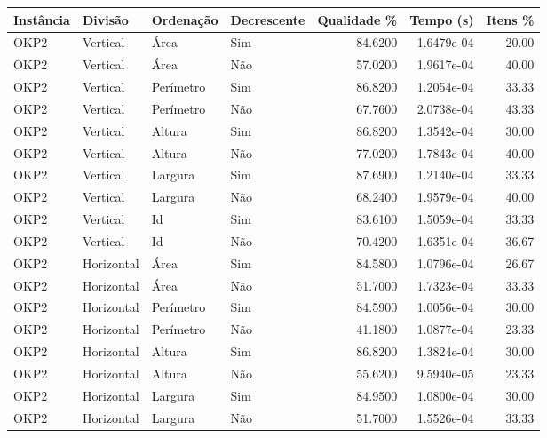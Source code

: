\begin{tabular}{llllrrr}
    \hline
    Instância & Divisão     & Ordenação & Decrescente & Qualidade \% & Tempo (s)  & Itens \% \\
    \hline
    OKP2      & Vertical    & Área      & Sim         & 84.6200      & 1.6479e-04 & 20.00    \\
    OKP2      & Vertical    & Área      & Não         & 57.0200      & 1.9617e-04 & 40.00    \\
    OKP2      & Vertical    & Perímetro & Sim         & 86.8200      & 1.2054e-04 & 33.33    \\
    OKP2      & Vertical    & Perímetro & Não         & 67.7600      & 2.0738e-04 & 43.33    \\
    OKP2      & Vertical    & Altura    & Sim         & 86.8200      & 1.3542e-04 & 30.00    \\
    OKP2      & Vertical    & Altura    & Não         & 77.0200      & 1.7843e-04 & 40.00    \\
    OKP2      & Vertical    & Largura   & Sim         & 87.6900      & 1.2140e-04 & 33.33    \\
    OKP2      & Vertical    & Largura   & Não         & 68.2400      & 1.9579e-04 & 40.00    \\
    OKP2      & Vertical    & Id        & Sim         & 83.6100      & 1.5059e-04 & 33.33    \\
    OKP2      & Vertical    & Id        & Não         & 70.4200      & 1.6351e-04 & 36.67    \\
    OKP2      & Horizontal  & Área      & Sim         & 84.5800      & 1.0796e-04 & 26.67    \\
    OKP2      & Horizontal  & Área      & Não         & 51.7000      & 1.7323e-04 & 33.33    \\
    OKP2      & Horizontal  & Perímetro & Sim         & 84.5900      & 1.0056e-04 & 30.00    \\
    OKP2      & Horizontal  & Perímetro & Não         & 41.1800      & 1.0877e-04 & 23.33    \\
    OKP2      & Horizontal  & Altura    & Sim         & 86.8200      & 1.3824e-04 & 30.00    \\
    OKP2      & Horizontal  & Altura    & Não         & 55.6200      & 9.5940e-05 & 23.33    \\
    OKP2      & Horizontal  & Largura   & Sim         & 84.9500      & 1.0800e-04 & 30.00    \\
    OKP2      & Horizontal  & Largura   & Não         & 51.7000      & 1.5526e-04 & 33.33    \\

\end{tabular}
